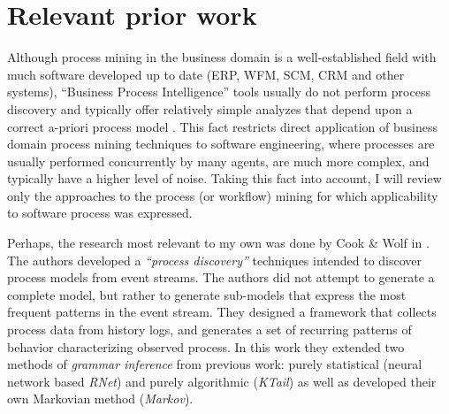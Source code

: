 \documentclass{sig-alternate}
\begin{document}
\section{Relevant prior work}
Although process mining in the business domain is a well-established field with much software developed up to date (ERP, WFM, SCM, CRM and other systems), ``Business Process Intelligence'' tools usually do not perform process discovery and typically offer relatively simple analyzes that depend upon a correct a-priori process model \cite{citeulike:5044991} \cite{citeulike:3718014} \cite{citeulike:2678511}. This fact restricts direct application of business domain process mining techniques to software engineering, where processes are usually performed concurrently by many agents, are much more complex, and typically have a higher level of noise. Taking this fact into account, I will review only the approaches to the process (or workflow) mining for which applicability to software process was expressed. 

Perhaps, the research most relevant to my own was done by Cook \& Wolf in \cite{citeulike:328044}. The authors developed a \textit{``process discovery''} techniques intended to discover process models from event streams. The authors did not attempt to generate a complete model, but rather to generate sub-models that express the most frequent patterns in the event stream. They designed a framework that collects process data from history logs, and generates a set of recurring patterns of behavior characterizing observed process. In this work they extended two methods of \textit{grammar inference} from previous work: purely statistical (neural network based \textit{RNet}) and purely algorithmic (\textit{KTail}) as well as developed their own Markovian method (\textit{Markov}). 
\end{document}
